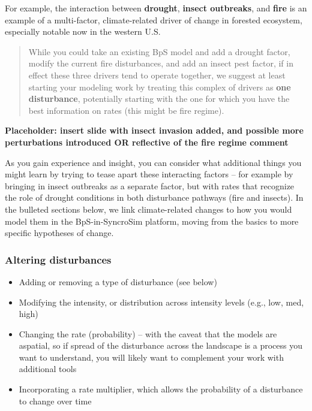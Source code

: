 \documentclass[
]{article}
\providecommand{\tightlist}{%
  \setlength{\itemsep}{0pt}\setlength{\parskip}{0pt}}
\begin{document}
For example, the interaction between \textbf{drought}, \textbf{insect
outbreaks}, and \textbf{fire} is an example of a multi-factor,
climate-related driver of change in forested ecosystem, especially
notable now in the western U.S.

\begin{quote}
While you could take an existing BpS model and add a drought factor,
modify the current fire disturbances, and add an insect pest factor, if
in effect these three drivers tend to operate together, we suggest at
least starting your modeling work by treating this complex of drivers as
\textbf{one disturbance}, potentially starting with the one for which
you have the best information on rates (this might be fire regime).
\end{quote}

\textbf{Placeholder: insert slide with insect invasion added, and
possible more perturbations introduced OR reflective of the fire regime
comment}

As you gain experience and insight, you can consider what additional
things you might learn by trying to tease apart these interacting
factors -- for example by bringing in insect outbreaks as a separate
factor, but with rates that recognize the role of drought conditions in
both disturbance pathways (fire and insects). In the bulleted sections
below, we link climate-related changes to how you would model them in
the BpS-in-SyncroSim platform, moving from the basics to more specific
hypotheses of change.

\hypertarget{altering-disturbances}{%
\subsubsection{Altering disturbances}\label{altering-disturbances}}

\begin{itemize}
\tightlist
\item
  Adding or removing a type of disturbance (see below)
\item
  Modifying the intensity, or distribution across intensity levels
  (e.g., low, med, high)
\item
  Changing the rate (probability) -- with the caveat that the models are
  aspatial, so if spread of the disturbance across the landscape is a
  process you want to understand, you will likely want to complement
  your work with additional tools
\item
  Incorporating a rate multiplier, which allows the probability of a
  disturbance to change over time
\end{itemize}
\end{document}
